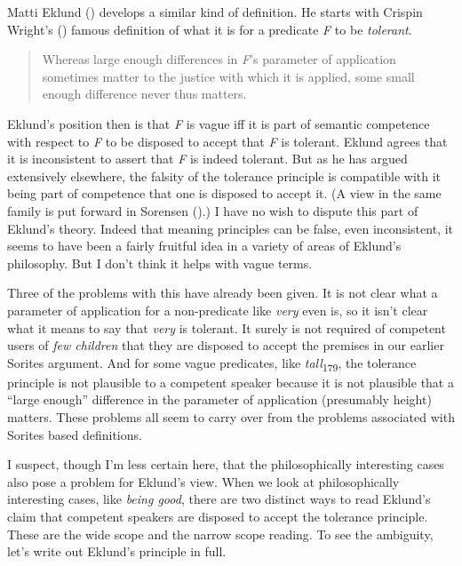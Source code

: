 \documentclass[
  11pt,
  letterpaper,
  DIV=11,
  numbers=noendperiod,
  twoside]{scrartcl}
\begin{document}
Matti Eklund () develops a similar kind
of definition. He starts with Crispin Wright's
() famous definition of what it is for a
predicate \emph{F} to be \emph{tolerant}.

\begin{quote}
Whereas large enough differences in \emph{F}'s parameter of application
sometimes matter to the justice with which it is applied, some small
enough difference never thus matters.
\end{quote}

Eklund's position then is that \emph{F} is vague iff it is part of
semantic competence with respect to \emph{F} to be disposed to accept
that \emph{F} is tolerant. Eklund agrees that it is inconsistent to
assert that \emph{F} is indeed tolerant. But as he has argued
extensively elsewhere, the falsity of the tolerance principle is
compatible with it being part of competence that one is disposed to
accept it. (A view in the same family is put forward in Sorensen
().) I have no wish to dispute this
part of Eklund's theory. Indeed that meaning principles can be false,
even inconsistent, it seems to have been a fairly fruitful idea in a
variety of areas of Eklund's philosophy. But I don't think it helps with
vague terms.

Three of the problems with this have already been given. It is not clear
what a parameter of application for a non-predicate like \emph{very}
even is, so it isn't clear what it means to say that \emph{very} is
tolerant. It surely is not required of competent users of \emph{few
children} that they are disposed to accept the premises in our earlier
Sorites argument. And for some vague predicates, like
\emph{tall}\textsubscript{179}, the tolerance principle is not plausible
to a competent speaker because it is not plausible that a ``large
enough'' difference in the parameter of application (presumably height)
matters. These problems all seem to carry over from the problems
associated with Sorites based definitions.

I suspect, though I'm less certain here, that the philosophically
interesting cases also pose a problem for Eklund's view. When we look at
philosophically interesting cases, like \emph{being good}, there are two
distinct ways to read Eklund's claim that competent speakers are
disposed to accept the tolerance principle. These are the wide scope and
the narrow scope reading. To see the ambiguity, let's write out Eklund's
principle in full.
\end{document}

